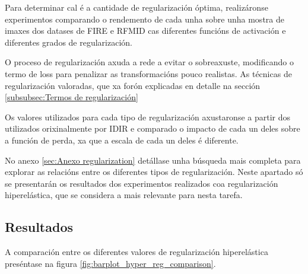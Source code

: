 Para determinar cal é a cantidade de regularización óptima, realizáronse experimentos comparando o rendemento de cada unha sobre unha mostra de imaxes dos datases de FIRE e RFMID cas diferentes funcións de activación e diferentes grados de regularización.

O proceso de regularización axuda a rede a evitar o sobreaxuste, modificando o termo de loss para penalizar as transformacións pouco realistas.
As técnicas de regularización valoradas, que xa forón explicadas en detalle na sección \ref{subsubsec:Termos de regularización}


Os valores utilizados para cada tipo de regularización axustaronse a partir dos utilizados orixinalmente por IDIR e comparado o impacto de cada un deles sobre a función de perda, xa que a escala de cada un deles é diferente.

No anexo \ref{sec:Anexo regularization} detállase unha búsqueda mais completa para explorar as relacións entre os diferentes tipos de regularización.
Neste apartado só se presentarán os resultados dos experimentos realizados coa regularización hiperelástica, que se considera a mais relevante para nesta tarefa.

\subsection{Resultados}
\label{subsec:Resultados-regularization}

A comparación entre os diferentes valores de regularización hiperelástica preséntase na figura \ref{fig:barplot_hyper_reg_comparison}.

